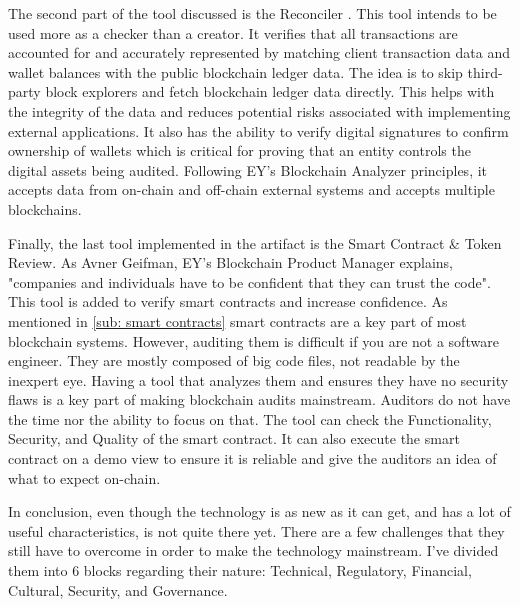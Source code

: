 The second part of the tool discussed is the Reconciler \cite{ey_reconciler}. This tool intends to be used more as a checker than a creator. It verifies that all transactions are accounted for and accurately represented by matching client transaction data and wallet balances with the public blockchain ledger data. The idea is to skip third-party block explorers and fetch blockchain ledger data directly. This helps with the integrity of the data and reduces potential risks associated with implementing external applications. It also has the ability to verify digital signatures to confirm ownership of wallets which is critical for proving that an entity controls the digital assets being audited. Following EY's Blockchain Analyzer principles, it accepts data from on-chain and off-chain external systems and accepts multiple blockchains. 

Finally, the last tool implemented in the artifact is the Smart Contract \& Token Review. As Avner Geifman, EY's Blockchain Product Manager \cite{ey_smartContrat_cite} explains, "companies and individuals have to be confident that they can trust the code". This tool is added to verify smart contracts and increase confidence. As mentioned in \cref{sub: smart contracts} smart contracts are a key part of most blockchain systems. However, auditing them is difficult if you are not a software engineer. They are mostly composed of big code files, not readable by the inexpert eye. Having a tool that analyzes them and ensures they have no security flaws is a key part of making blockchain audits mainstream. Auditors do not have the time nor the ability to focus on that. The tool can check the Functionality, Security, and Quality of the smart contract. It can also execute the smart contract on a demo view to ensure it is reliable and give the auditors an idea of what to expect on-chain.  

In conclusion, even though the technology is as new as it can get, and has a lot of useful characteristics, is not quite there yet. There are a few challenges that they still have to overcome in order to make the technology mainstream. I've divided them into 6 blocks regarding their nature: Technical, Regulatory, Financial, Cultural, Security, and Governance.

